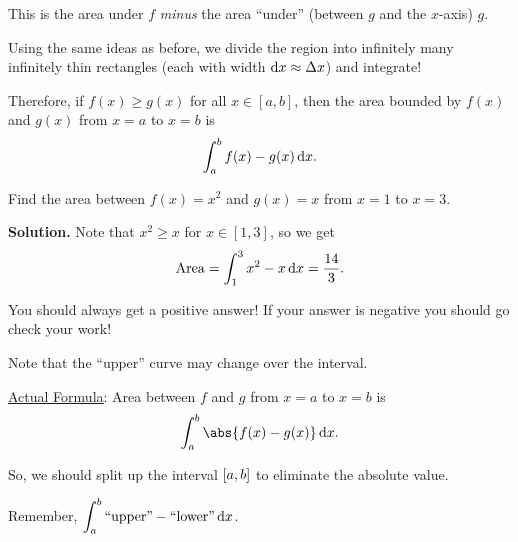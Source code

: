 This is the area under $ f $ \emph{minus} the area ``under'' (between $ g $ and the
$ x $-axis) $ g $.

Using the same ideas as before, we divide the region into infinitely many infinitely thin
rectangles (each with width $ \odif{x}\approx \Delta x $) and integrate!

Therefore, if $ f(x)\ge g(x) $ for all $ x\in[a,b] $, then the area bounded by
$ f(x) $ and $ g(x) $ from $ x=a $ to $ x=b $ is
\[ \int_{a}^{b} f(x)-g(x)\odif{x}. \]

\begin{Example}{}{}
    Find the area between $ f(x)=x^2 $ and $ g(x)=x $ from $ x=1 $ to $ x=3 $.

    \begin{center}
    \end{center}

    \textbf{Solution.} Note that $ x^2\ge x $ for $ x\in[1,3] $, so we get
    \[ \text{Area}
        =\int_{1}^{3}x^2-x\odif{x}=\frac{14}{3}. \]
\end{Example}

\begin{Remark}{}{}
    You should always get a positive answer! If your answer is negative you should go check
    your work!

    Note that the ``upper'' curve may change over the interval.
\end{Remark}

\underline{Actual Formula}: Area between $ f $ and $ g $ from $ x=a $ to $ x=b $ is
\[ \int_{a}^{b} \abs{f(x)-g(x)}\odif{x}.  \]

So, we should split up the interval $ \interval{a}{b} $ to eliminate
the absolute value.

Remember, $ \displaystyle \int_{a}^{b} \text{``upper''}-\text{``lower''}\odif{x} $.

